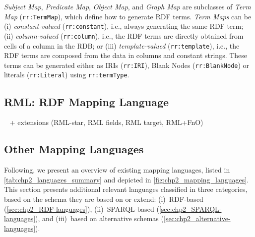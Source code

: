\textit{Subject Map}, \textit{Predicate Map}, \textit{Object Map}, and \textit{Graph Map} are subclasses of \textit{Term Map} (\texttt{rr:TermMap}), which define how to generate RDF terms. 
\textit{Term Maps} can be (i) \textit{constant-valued} (\texttt{rr:constant}), i.e., always generating the same RDF term; 
(ii) \textit{column-valued} (\texttt{rr:column}), i.e., the RDF terms are directly obtained from cells of a column in the RDB; 
or (iii) \textit{template-valued} (\texttt{rr:template}), i.e., the RDF terms are composed from the data in columns and constant strings. These terms can be generated either as IRIs (\texttt{rr:IRI}), Blank Nodes (\texttt{rr:BlankNode}) or literals (\texttt{rr:Literal}) using \texttt{rr:termType}.  


\subsection{RML: RDF Mapping Language}
\label{sec:chp2_RML}

~\parencite{Dimou2014rml} + extensions (RML-star, RML fields, RML target, RML+FnO)



\subsection{Other Mapping Languages}
\label{sec:chp2_more-languages}

Following, we present an overview of existing mapping languages, listed in \cref{tab:chp2_languages_summary} and depicted in  \cref{fig:chp2_mapping_languages}. This section presents additional relevant languages classified in three categories, based on the schema they are based on or extend: (i)~RDF-based (\cref{sec:chp2_RDF-languages}), (ii)~SPARQL-based (\cref{sec:chp2_SPARQL-languages}), and (iii)~based on alternative schemas (\cref{sec:chp2_alternative-languages}).


